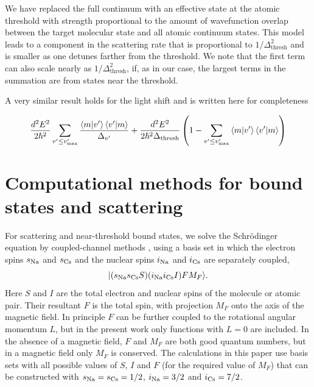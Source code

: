 \documentclass[aps,secnumarabic,amsmath,amssymb,10pt,superscriptaddress]{revtex4}
\begin{document}
We have replaced the full continuum with an effective state at the atomic threshold with strength proportional to the amount of wavefunction overlap between the target molecular state and all atomic continuum states. This model leads to a component in the scattering rate that is proportional to $ 1/\Delta_{\text{thresh}}^2$ and is smaller as one detunes farther from the threshold. We note that the first term can also scale nearly as $1/\Delta_{\text{thresh}}^2 $, if, as in our case, the largest terms in the summation are from states near the threshold.

A very similar result holds for the light shift and is written here for completeness

\begin{equation}
  \frac{d^2E^2}{2\hbar^2}\displaystyle\sum_{v' \leq v'_{\text{max}}} \frac{\braket{m|v'}\braket{v'|m}}{\Delta_{v'}} +  \frac{d^2E^2}{2\hbar^2\Delta_{\text{thresh}}}\left(1 - \displaystyle\sum_{v' \leq v'_{\text{max}}}\braket{m|v'}\braket{v'|m}\right)
\end{equation}

\section{Computational methods for bound states and scattering}

For scattering and near-threshold bound states, we solve the Schr\"odinger equation by
coupled-channel methods \cite{HUTSON1994}, using a basis set in which the electron spins
$s_{\rm Na}$ and $s_{\rm Cs}$ and the nuclear spins $i_{\rm Na}$ and $i_{\rm Cs}$ are separately
coupled,
\begin{equation}
  | (s_{\rm Na} s_{\rm Cs} S)
  (i_{\rm Na} i_{\rm Cs} I) F M_F\rangle.
  \label{eqbassif}
\end{equation}
Here $S$ and $I$ are the total electron and nuclear spins of the molecule or atomic pair. Their
resultant $F$ is the total spin, with projection $M_F$ onto the axis of the magnetic field. In
principle $F$ can be further coupled to the rotational angular momentum $L$, but in the present
work only functions with $L=0$ are included. In the absence of a magnetic field, $F$ and $M_F$ are
both good quantum numbers, but in a magnetic field only $M_F$ is conserved. The calculations in
this paper use basis sets with all possible values of $S$, $I$ and $F$ (for the required value of
$M_F$) that can be constructed with $s_{\rm Na} = s_{\rm Cs} = 1/2$,
$i_{\rm Na} = 3/2$ and $i_{\rm Cs} = 7/2$.
\end{document}
